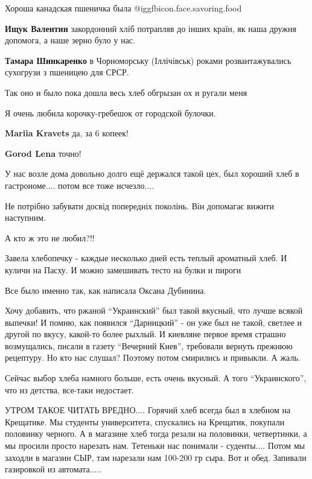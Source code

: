 \begin{itemize}
Хороша канадская пшеничка была @igg{fbicon.face.savoring.food} 

\begin{itemize} %
\textbf{Ищук Валентин} закордонний хліб потрапляв до інших країн, як наша дружня допомога, а наше зерно було у нас.

\textbf{Тамара Шинкаренко} в Чорноморську (Іллічівськ) роками розвантажувались сухогрузи з пшеницею для СРСР.
\end{itemize} %

Так оно и было пока дошла весь хлеб обгрызан ох и ругали меня

Я очень любила корочку-гребешок от городской булочки.

\textbf{Mariia Kravets} да, за 6 копеек!

\textbf{Gorod Lena} точно!

У нас возле дома довольно долго ещё держался такой цех, был хороший хлеб в
гастрономе.... потом все тоже исчезло....

Не потрібно забувати досвід попередніх поколінь. Він допомагає вижити наступним.


А кто ж это не любил?!!


Завела хлебопечку - каждые несколько дней есть теплый ароматный хлеб. И куличи
на Пасху. И можно замешивать тесто на булки и пироги


Все было именно так, как написала Оксана Дубинина.

Хочу добавить, что ржаной \enquote{Украинский} был такой вкусный, что лучше всякой
выпечки! И помню, как появился \enquote{Дарницкий} - он уже был не такой, светлее и
другой по вкусу, какой-то более рыхлый. И киевляне первое время страшно
возмущались, писали в газету \enquote{Вечерний Киев}, требовали вернуть прежнюю
рецептуру. Но кто нас слушал? Поэтому потом смирились и привыкли. А жаль.

Сейчас выбор хлеба намного больше, есть очень вкусный. А того \enquote{Украинского},
что из детства, все-таки недостает.


УТРОМ ТАКОЕ ЧИТАТЬ ВРЕДНО.... Горячий хлеб всегда был в хлебном на Крещатике. Мы
студенты университета, спускались на Крещатик, покупали половинку черного. А в
магазине хлеб тогда резали на половинки, четвертинки, а мы просили просто
нарезать нам. Тетеньки нас понимали - суденты.... Потом мы заходли в магазин
СЫР, там нарезали нам 100-200 гр сыра. Вот и обед. Запивали газировкой из
автомата.....



\end{itemize}
